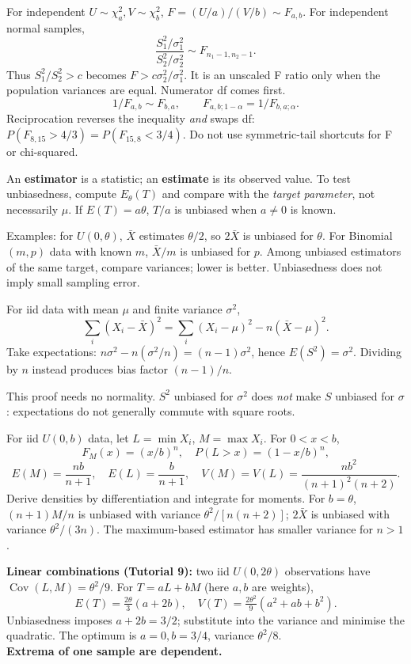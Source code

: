 \documentclass[10pt]{article}
\newcommand{\warn}[1]{\textbf{\color{red!65!black}#1}}
\newcommand{\boxstart}[1]{\begin{tcolorbox}[title={#1},sharp corners]}
\newcommand{\boxend}{\end{tcolorbox}}
\begin{document}
\begin{multicols*}{3}
\boxstart{Ch. 5 --- F ratios: scaling, order and reciprocals}
For independent $U\sim\chi^2_a,V\sim\chi^2_b$, $F=(U/a)/(V/b)\sim F_{a,b}$. For independent normal samples,
\[
\frac{S_1^2/\sigma_1^2}{S_2^2/\sigma_2^2}\sim F_{n_1-1,n_2-1}.
\]
Thus $S_1^2/S_2^2>c$ becomes $F>c\sigma_2^2/\sigma_1^2$. It is an unscaled F ratio only when the population variances are equal. Numerator df comes first.
\[
1/F_{a,b}\sim F_{b,a},\qquad
F_{a,b;1-\alpha}=1/F_{b,a;\alpha}.
\]
Reciprocation reverses the inequality \emph{and} swaps df: $P(F_{8,15}>4/3)=P(F_{15,8}<3/4)$. Do not use symmetric-tail shortcuts for F or chi-squared.
\boxend

\columnbreak
\boxstart{Ch. 6 --- Point estimates, bias and efficiency}
An \textbf{estimator} is a statistic; an \textbf{estimate} is its observed value. To test unbiasedness, compute $E_\theta(T)$ and compare with the \emph{target parameter}, not necessarily $\mu$. If $E(T)=a\theta$, $T/a$ is unbiased when $a\ne0$ is known.

Examples: for $U(0,\theta)$, $\bar X$ estimates $\theta/2$, so $2\bar X$ is unbiased for $\theta$. For Binomial$(m,p)$ data with known $m$, $\bar X/m$ is unbiased for $p$. Among unbiased estimators of the same target, compare variances; lower is better. Unbiasedness does not imply small sampling error.
\boxend

\boxstart{Ch. 5/6 --- Why the sample variance uses $n-1$}
For iid data with mean $\mu$ and finite variance $\sigma^2$,
\[
\sum_i(X_i-\bar X)^2=\sum_i(X_i-\mu)^2-n(\bar X-\mu)^2.
\]
Take expectations: $n\sigma^2-n(\sigma^2/n)=(n-1)\sigma^2$, hence $E(S^2)=\sigma^2$. Dividing by $n$ instead produces bias factor $(n-1)/n$.

This proof needs no normality. $S^2$ unbiased for $\sigma^2$ does \emph{not} make $S$ unbiased for $\sigma$: expectations do not generally commute with square roots.
\boxend

\boxstart{Ch. 6 --- Uniform extrema: tutorial estimator toolkit}
For iid $U(0,b)$ data, let $L=\min X_i$, $M=\max X_i$. For $0<x<b$,
\[
F_M(x)=(x/b)^n,\quad P(L>x)=(1-x/b)^n,
\]
\[
E(M)=\frac{nb}{n+1},\quad E(L)=\frac{b}{n+1},\quad
V(M)=V(L)=\frac{nb^2}{(n+1)^2(n+2)}.
\]
Derive densities by differentiation and integrate for moments. For $b=\theta$, $(n+1)M/n$ is unbiased with variance $\theta^2/[n(n+2)]$; $2\bar X$ is unbiased with variance $\theta^2/(3n)$. The maximum-based estimator has smaller variance for $n>1$.

\textbf{Linear combinations (Tutorial 9):} two iid $U(0,2\theta)$ observations have $\operatorname{Cov}(L,M)=\theta^2/9$. For $T=aL+bM$ (here $a,b$ are weights),
\[
E(T)=\tfrac{2\theta}{3}(a+2b),\quad
V(T)=\tfrac{2\theta^2}{9}(a^2+ab+b^2).
\]
Unbiasedness imposes $a+2b=3/2$; substitute into the variance and minimise the quadratic. The optimum is $a=0,b=3/4$, variance $\theta^2/8$. \\
\warn{Extrema of one sample are dependent.}
\boxend


\end{multicols*}
\end{document}
